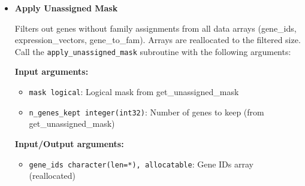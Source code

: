 \begin{enumerate}
\begin{itemize}
                  \textbf{Input arguments:}
                  \begin{itemize}
                    \item \texttt{gene\_to\_fam integer(int32)}: Gene to family mapping array
                  \end{itemize}
                  \textbf{Output arguments:}
                  \begin{itemize}
                    \item \texttt{mask logical}: Logical mask array (same size as gene\_to\_fam)
                          
                    \item \texttt{n\_genes\_kept integer(int32)}: Number of genes with family
                          assignments
                          
                    \item \texttt{ierr integer(int32)}: Error code
                  \end{itemize}
                  \begin{lstlisting}[language=Fortran, caption={Create Unassigned Genes Mask}]
logical :: unassigned_mask(n_genes)
integer(int32) :: n_kept, ierr

call get_unassigned_mask(gene_to_fam, unassigned_mask, n_kept)
! unassigned_mask(i) = .true. if gene i has family assignment
! n_kept = count of genes with family assignments
                  \end{lstlisting}
                  
            \item \textbf{Apply Unassigned Mask}
                  
                  Filters out genes without family assignments from all data arrays (gene\_ids,
                  expression\_vectors, gene\_to\_fam). Arrays are reallocated to the
                  filtered size. Call the \texttt{apply\_unassigned\_mask} subroutine
                  with the following arguments:
                  
                  \textbf{Input arguments:}
                  \begin{itemize}
                    \item \texttt{mask logical}: Logical mask from get\_unassigned\_mask
                          
                    \item \texttt{n\_genes\_kept integer(int32)}: Number of genes to keep
                          (from get\_unassigned\_mask)
                  \end{itemize}
                  \textbf{Input/Output arguments:}
                  \begin{itemize}
                    \item \texttt{gene\_ids character(len=*), allocatable}: Gene IDs array
                          (reallocated)
                          

\end{itemize}
\end{itemize}
\end{enumerate}
